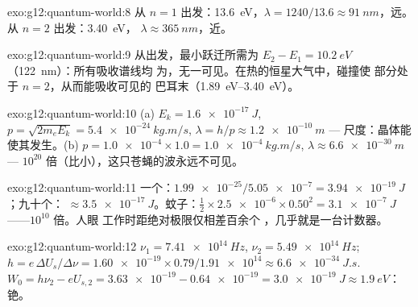 \begin{solution}{exo:g12:quantum-world:8}
从 $n = 1$ 出发：\qty{13.6}{eV}，$\lambda = 1240/13.6 \approx
\qty{91}{nm}$，远。从 $n = 2$ 出发：\qty{3.40}{eV}，
$\lambda \approx \qty{365}{nm}$，近。
\end{solution}

\begin{solution}{exo:g12:quantum-world:9}
从出发，最小跃迁所需为 $E_2 - E_1 =
\qty{10.2}{eV}$（\qty{122}{nm}）：所有吸收谱线均
为，无一可见。在热的恒星大气中，碰撞使
部分处于 $n = 2$，从而能吸收可见的
巴耳末（\qtyrange{1.89}{3.40}{eV}）。
\end{solution}

\begin{solution}{exo:g12:quantum-world:10}
(a) $E_k = \qty{1.6e-17}{J}$, $p = \sqrt{2m_e E_k} =
\qty{5.4e-24}{kg.m/s}$, $\lambda = h/p \approx \qty{1.2e-10}{m}$ ---
尺度：晶体能使其发生。(b) $p = \num{1.0e-4} \times 1.0 =
\qty{1.0e-4}{kg.m/s}$, $\lambda \approx \qty{6.6e-30}{m}$ --- $10^{20}$
倍（比小），这只苍蝇的波永远不可见。
\end{solution}

\begin{solution}{exo:g12:quantum-world:11}
一个：$\num{1.99e-25}/\num{5.05e-7} = \qty{3.94e-19}{J}$；九十个：
$\approx \qty{3.5e-17}{J}$。蚊子：$\tfrac12 \times \num{2.5e-6}
\times 0.50^2 = \qty{3.1e-7}{J}$——$10^{10}$ 倍。人眼
工作时距绝对极限仅相差百余个
，几乎就是一台计数器。
\end{solution}

\begin{solution}{exo:g12:quantum-world:12}
$\nu_1 = \qty{7.41e14}{Hz}$, $\nu_2 = \qty{5.49e14}{Hz}$;
$h = e\,\Delta U_s/\Delta\nu = \num{1.60e-19} \times 0.79 /
\num{1.91e14} \approx \qty{6.6e-34}{J.s}$. $W_0 = h\nu_2 - eU_{s,2} =
\num{3.63e-19} - \num{0.64e-19} = \qty{3.0e-19}{J} \approx
\qty{1.9}{eV}$：铯。
\end{solution}

